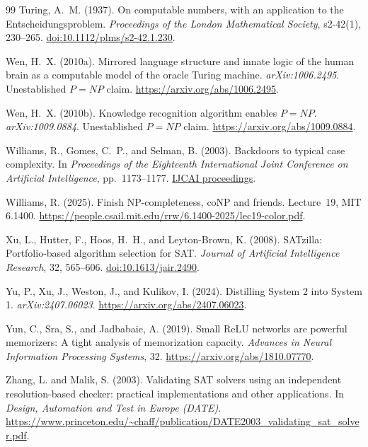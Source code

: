 \documentclass[11pt,a4paper]{article}
\numberwithin{equation}{section}
\theoremstyle{plain}
\theoremstyle{definition}
\theoremstyle{remark}
\begin{document}
\begin{thebibliography}{99}
Turing, A.~M. (1937).
On computable numbers, with an application to the Entscheidungsproblem.
\emph{Proceedings of the London Mathematical Society}, s2-42(1), 230--265.
\href{https://doi.org/10.1112/plms/s2-42.1.230}{doi:10.1112/plms/s2-42.1.230}.

Wen, H.~X. (2010a).
Mirrored language structure and innate logic of the human brain as a computable model of the oracle Turing machine.
\emph{arXiv:1006.2495}. Unestablished $P=NP$ claim.
\url{https://arxiv.org/abs/1006.2495}.

Wen, H.~X. (2010b).
Knowledge recognition algorithm enables $P=NP$.
\emph{arXiv:1009.0884}. Unestablished $P=NP$ claim.
\url{https://arxiv.org/abs/1009.0884}.

Williams, R., Gomes, C.~P., and Selman, B. (2003).
Backdoors to typical case complexity.
In \emph{Proceedings of the Eighteenth International Joint Conference on
Artificial Intelligence}, pp.~1173--1177.
\href{https://ijcai.org/proceedings/2003/167}{IJCAI proceedings}.

Williams, R. (2025).
Finish NP-completeness, coNP and friends. Lecture~19, MIT 6.1400.
\url{https://people.csail.mit.edu/rrw/6.1400-2025/lec19-color.pdf}.

Xu, L., Hutter, F., Hoos, H.~H., and Leyton-Brown, K. (2008).
SATzilla: Portfolio-based algorithm selection for SAT.
\emph{Journal of Artificial Intelligence Research}, 32, 565--606.
\href{https://doi.org/10.1613/jair.2490}{doi:10.1613/jair.2490}.

Yu, P., Xu, J., Weston, J., and Kulikov, I. (2024).
Distilling System 2 into System 1.
\emph{arXiv:2407.06023}.
\url{https://arxiv.org/abs/2407.06023}.

Yun, C., Sra, S., and Jadbabaie, A. (2019).
Small ReLU networks are powerful memorizers: A tight analysis of memorization capacity.
\emph{Advances in Neural Information Processing Systems}, 32.
\url{https://arxiv.org/abs/1810.07770}.


Zhang, L. and Malik, S. (2003).
\newblock Validating SAT solvers using an independent resolution-based checker:
practical implementations and other applications.
\newblock In \emph{Design, Automation and Test in Europe (DATE)}.
\newblock \url{https://www.princeton.edu/~chaff/publication/DATE2003_validating_sat_solver.pdf}.

\end{thebibliography}
\endgroup
\end{document}
